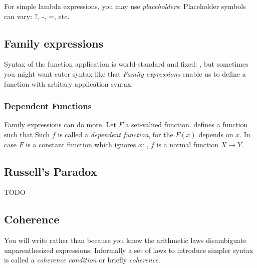 For simple lambda expressions, you may use \textit{placeholders}:
Placeholder symbols can vary: $\texttt{?}$, $\texttt{-}$, $\texttt{=}$, etc.


\subsection{Family expressions}

Syntax of the function application is world-standard and fixed:
, but sometimes you might want cuter syntax like that
\textit{Family expressions} enable us to define a function with arbitary application syntax:

\subsubsection{Dependent Functions}

Family expressions can do more. Let $F$ a set-valued function.
defines a function
such that
Such $f$ is called a \textit{dependent function}, for the $F(x)$ depends on $x$. 
In case $F$ is a constant function which ignores $x$:
, $f$ is a normal function $X \to Y$. 

\subsection{Russell's Paradox}
TODO

\subsection{Coherence}

You will write
rather than
because you know the arithmetic laws
disambiguate unparenthesized expressions.
Informally a set of laws to introduce simpler syntax is called a \textit{coherence condition} or briefly \textit{coherence}.

